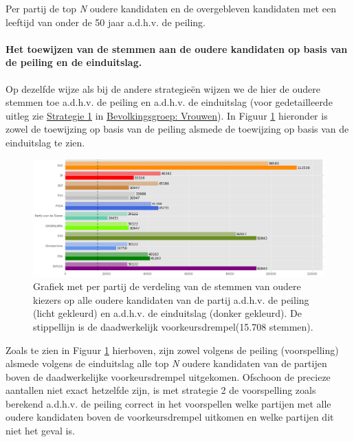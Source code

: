 \begin{table}[h]
\centering
	\begin{footnotesize}
		
	\end{footnotesize}
			\caption{Per partij de top \textit{N} oudere kandidaten en de overgebleven kandidaten met een leeftijd van onder de 50 jaar a.d.h.v. de peiling.}
\label{table:tab3O} 
\end{table}



\paragraph{Het toewijzen van de stemmen aan de oudere kandidaten op basis van de peiling en de einduitslag.}
Op dezelfde wijze als bij de andere strategie\"{e}n wijzen we de hier de oudere stemmen toe a.d.h.v. de peiling en a.d.h.v. de einduitslag (voor gedetailleerde uitleg zie \hyperref[S1V]{Strategie 1} in \hyperref[vrouwen]{Bevolkingsgroep: Vrouwen}). In Figuur \ref{fig:stemmenS1O} hieronder is zowel de toewijzing op basis van de peiling alsmede de toewijzing op basis van de einduitslag te zien.


\begin{figure}[H]

	\includegraphics[width=\linewidth]	{stemmen_op_ouderen_topN_peiling.png}

			\caption{Grafiek met per partij de verdeling van de stemmen van oudere kiezers op alle oudere kandidaten van de partij a.d.h.v. de peiling (licht gekleurd) en a.d.h.v. de einduitslag (donker gekleurd). De stippellijn is de daadwerkelijk voorkeursdrempel(15.708 stemmen).}

\label{fig:stemmenS1O}
\end{figure}


Zoals te zien in Figuur \ref{fig:stemmenS1O} hierboven, zijn zowel volgens de peiling (voorspelling) alsmede volgens de einduitslag alle top \textit{N} oudere kandidaten van de partijen boven de daadwerkelijke voorkeursdrempel uitgekomen. Ofschoon de precieze aantallen niet exact hetzelfde zijn, is met strategie 2 de voorspelling zoals berekend a.d.h.v. de peiling correct in het voorspellen welke partijen met alle oudere kandidaten boven de voorkeursdrempel uitkomen en welke partijen dit niet het geval is.

